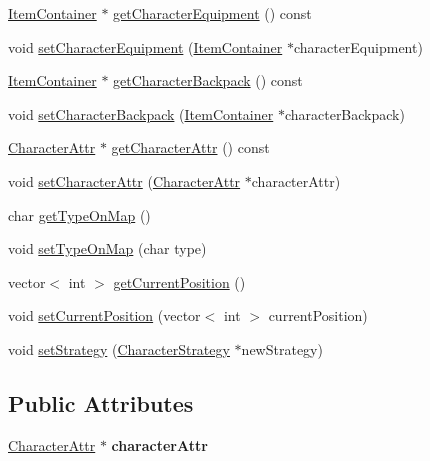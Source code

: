 \begin{DoxyCompactItemize}
\item 
\hyperlink{class_item_container}{Item\+Container} $\ast$ \hyperlink{class_character_a8c40b0753d44d6894cc0d3104017b0cc}{get\+Character\+Equipment} () const
\item 
void \hyperlink{class_character_aa36f485d4d779b33cb3da8997c3072c5}{set\+Character\+Equipment} (\hyperlink{class_item_container}{Item\+Container} $\ast$character\+Equipment)
\item 
\hyperlink{class_item_container}{Item\+Container} $\ast$ \hyperlink{class_character_a9b92a46740a48fceee9440961085515f}{get\+Character\+Backpack} () const
\item 
void \hyperlink{class_character_aee2b7dc1104b26053abae5ca8606d9ed}{set\+Character\+Backpack} (\hyperlink{class_item_container}{Item\+Container} $\ast$character\+Backpack)
\item 
\hyperlink{class_character_attr}{Character\+Attr} $\ast$ \hyperlink{class_character_a7334ab9ffc361aa1c69344ea35467931}{get\+Character\+Attr} () const
\item 
void \hyperlink{class_character_adeafa649ad931a4f84516de0b3017f45}{set\+Character\+Attr} (\hyperlink{class_character_attr}{Character\+Attr} $\ast$character\+Attr)
\item 
char \hyperlink{class_character_a51e80d6194b8c0f4558b593c8e9b58f6}{get\+Type\+On\+Map} ()
\item 
void \hyperlink{class_character_af8b82c71db9032450b44133bc43c4668}{set\+Type\+On\+Map} (char type)
\item 
vector$<$ int $>$ \hyperlink{class_character_a2833ce301aebf894598a0b0f522500bb}{get\+Current\+Position} ()
\item 
void \hyperlink{class_character_a89b588fbe9b28bb6c907b33f75bc31bc}{set\+Current\+Position} (vector$<$ int $>$ current\+Position)
\item 
void \hyperlink{class_character_a1035f8b0180e00a2d28ffc1caf26aad8}{set\+Strategy} (\hyperlink{class_character_strategy}{Character\+Strategy} $\ast$new\+Strategy)
\end{DoxyCompactItemize}
\subsection*{Public Attributes}
\begin{DoxyCompactItemize}
\item 
\hypertarget{class_character_a7e13a336d0073862d6c3e44382009a11}{}\label{class_character_a7e13a336d0073862d6c3e44382009a11} 
\hyperlink{class_character_attr}{Character\+Attr} $\ast$ {\bfseries character\+Attr}
\end{DoxyCompactItemize}
